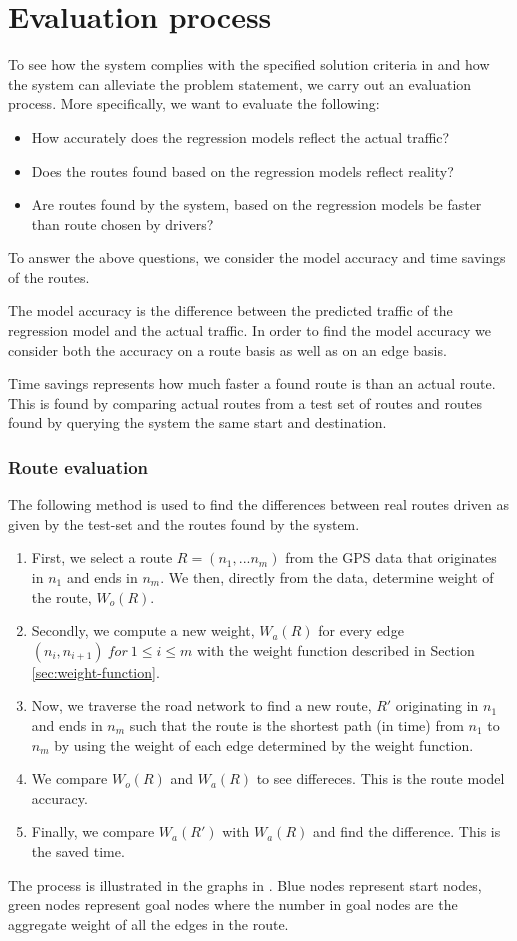 \section{Evaluation process}
To see how the system complies with the specified solution criteria in  and how the system can alleviate the problem statement, we carry out an evaluation process. More specifically, we want to evaluate the following:
\begin{itemize}
\item How accurately does the regression models reflect the actual traffic?
\item Does the routes found based on the regression models reflect reality?
\item Are routes found by the system, based on the regression models be faster than route chosen by drivers?
\end{itemize}
To answer the above questions, we consider the model accuracy and time savings of the routes. 

The model accuracy is the difference between the predicted traffic of the regression model and the actual traffic. In order to find the model accuracy we consider both the accuracy on a route basis as well as on an edge basis.

Time savings represents how much faster a found route is than an actual route. This is found by comparing actual routes from a test set of routes and routes found by querying the system the same start and destination.

\subsubsection{Route evaluation}
The following method is used to find the differences between real routes driven as given by the test-set and the routes found by the system.
\begin{enumerate}
\item First, we select a route $R=(n_1,...n_m)$ from the GPS data that originates in $n_1$ and ends in $n_m$. We then, directly from the data, determine weight of the route, $W_o(R)$.
\item Secondly, we compute a new weight, $W_{a}(R)$ for every edge $(n_i,n_{i+1}) \  for \  1 \leq i \leq m$ with the weight function described in Section \ref{sec:weight-function}.
\item Now, we traverse the road network to find a new route, $R'$ originating in $n_1$ and ends in $n_m$ such that the route is the shortest path (in time) from $n_1$ to $n_m$ by using the weight of each edge determined by the weight function.
\item We compare $W_o(R)$ and $W_a(R)$ to see differeces. This is the route model accuracy.
\item Finally, we compare $W_a(R')$ with $W_a(R)$ and find the difference. This is the saved time.
\end{enumerate}
The process is illustrated in the graphs in . Blue nodes represent start nodes, green nodes represent goal nodes where the number in goal nodes are the aggregate weight of all the edges in the route. 

